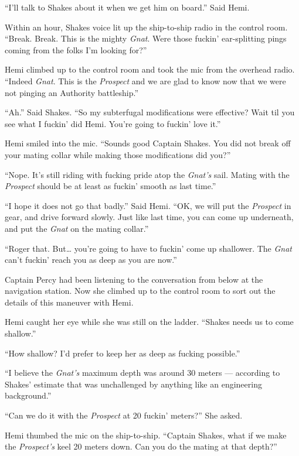 \documentclass[
]{scrbook}
\begin{document}
``I'll talk to Shakes about it when we get him on board.'' Said Hemi.

Within an hour, Shakes voice lit up the ship-to-ship radio in the
control room. ``Break. Break. This is the mighty \emph{Gnat}. Were those
fuckin' ear-splitting pings coming from the folks I'm looking for?''

Hemi climbed up to the control room and took the mic from the overhead
radio. ``Indeed \emph{Gnat}. This is the \emph{Prospect} and we are glad
to know now that we were not pinging an Authority battleship.''

``Ah.'' Said Shakes. ``So my subterfugal modifications were effective?
Wait til you see what I fuckin' did Hemi. You're going to fuckin' love
it.''

Hemi smiled into the mic. ``Sounds good Captain Shakes. You did not
break off your mating collar while making those modifications did you?''

``Nope. It's still riding with fucking pride atop the \emph{Gnat's}
sail. Mating with the \emph{Prospect} should be at least as fuckin'
smooth as last time.''

``I hope it does not go that badly.'' Said Hemi. ``OK, we will put the
\emph{Prospect} in gear, and drive forward slowly. Just like last time,
you can come up underneath, and put the \emph{Gnat} on the mating
collar.''

``Roger that. But\ldots{} you're going to have to fuckin' come up
shallower. The \emph{Gnat} can't fuckin' reach you as deep as you are
now.''

Captain Percy had been listening to the conversation from below at the
navigation station. Now she climbed up to the control room to sort out
the details of this maneuver with Hemi.

Hemi caught her eye while she was still on the ladder. ``Shakes needs us
to come shallow.''

``How shallow? I'd prefer to keep her as deep as fucking possible.''

``I believe the \emph{Gnat's} maximum depth was around 30 meters ---
according to Shakes' estimate that was unchallenged by anything like an
engineering background.''

``Can we do it with the \emph{Prospect} at 20 fuckin' meters?'' She
asked.

Hemi thumbed the mic on the ship-to-ship. ``Captain Shakes, what if we
make the \emph{Prospect's} keel 20 meters down. Can you do the mating at
that depth?''
\end{document}

